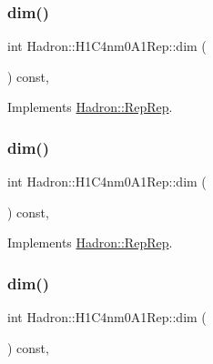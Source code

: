\subsubsection{\texorpdfstring{dim()}{dim()}\hspace{0.1cm}{\footnotesize\ttfamily [3/5]}}
{\footnotesize\ttfamily int Hadron\+::\+H1\+C4nm0\+A1\+Rep\+::dim (\begin{DoxyParamCaption}{ }\end{DoxyParamCaption}) const\hspace{0.3cm}{\ttfamily [inline]}, {\ttfamily [virtual]}}



Implements \mbox{\hyperlink{structHadron_1_1RepRep_a92c8802e5ed7afd7da43ccfd5b7cd92b}{Hadron\+::\+Rep\+Rep}}.

\mbox{\label{structHadron_1_1H1C4nm0A1Rep_a1df356297c0d6488269ed5066b7f2a60}} 
\subsubsection{\texorpdfstring{dim()}{dim()}\hspace{0.1cm}{\footnotesize\ttfamily [4/5]}}
{\footnotesize\ttfamily int Hadron\+::\+H1\+C4nm0\+A1\+Rep\+::dim (\begin{DoxyParamCaption}{ }\end{DoxyParamCaption}) const\hspace{0.3cm}{\ttfamily [inline]}, {\ttfamily [virtual]}}



Implements \mbox{\hyperlink{structHadron_1_1RepRep_a92c8802e5ed7afd7da43ccfd5b7cd92b}{Hadron\+::\+Rep\+Rep}}.

\mbox{\label{structHadron_1_1H1C4nm0A1Rep_a1df356297c0d6488269ed5066b7f2a60}} 
\subsubsection{\texorpdfstring{dim()}{dim()}\hspace{0.1cm}{\footnotesize\ttfamily [5/5]}}
{\footnotesize\ttfamily int Hadron\+::\+H1\+C4nm0\+A1\+Rep\+::dim (\begin{DoxyParamCaption}{ }\end{DoxyParamCaption}) const\hspace{0.3cm}{\ttfamily [inline]}, {\ttfamily [virtual]}}



